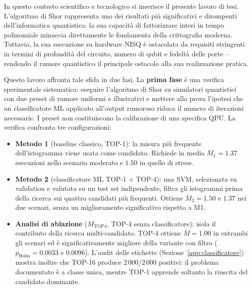 \begin{onehalfspace}
In questo contesto scientifico e tecnologico si inserisce il presente lavoro di tesi. L'algoritmo di Shor rappresenta uno dei risultati più significativi e dirompenti dell'informatica quantistica: la sua capacità di fattorizzare interi in tempo polinomiale minaccia direttamente le fondamenta della crittografia moderna. Tuttavia, la sua esecuzione su hardware NISQ è ostacolata da requisiti stringenti in termini di profondità del circuito, numero di qubit e fedeltà delle porte -- rendendo il rumore quantistico il principale ostacolo alla sua realizzazione pratica.

Questo lavoro affronta tale sfida in due fasi. La \textbf{prima fase} è una verifica sperimentale sistematica: eseguire l'algoritmo di Shor su simulatori quantistici con due preset di rumore uniformi e illustrativi e mettere alla prova l'ipotesi che un classificatore \ac{ML} applicato all'output rumoroso riduca il numero di iterazioni necessarie. I preset non costituiscono la calibrazione di una specifica QPU. La verifica confronta tre configurazioni:
\begin{itemize}
    \item \textbf{Metodo 1} (baseline classico, TOP-1): la misura più frequente dell'istogramma viene usata come candidato. Richiede in media $\bar{M}_1=1.37$ esecuzioni nello scenario moderato e $1.50$ in quello di stress.
    \item \textbf{Metodo 2} (classificatore \ac{ML} TOP-1 + TOP-4): una \ac{SVM}, selezionata su validation e valutata su un test set indipendente, filtra gli istogrammi prima della ricerca sui quattro candidati più frequenti. Ottiene $\bar{M}_2=1.50$ e $1.37$ nei due scenari, senza un miglioramento significativo rispetto a M1.
    \item \textbf{Analisi di ablazione} ($M_{\text{TOP4}}$, TOP-4 senza classificatore): isola il contributo della ricerca multi-candidato. TOP-4 ottiene $\bar{M}=1.00$ in entrambi gli scenari ed è significativamente migliore della variante con filtro ($p_{\mathrm{Holm}}=0.0033$ e $0.0096$). L'audit delle etichette (Sezione~\ref{app:classificatore}) mostra inoltre che TOP-16 produce $2\,000/2\,000$ positivi: il problema documentato è a classe unica, mentre TOP-1 apprende soltanto la riuscita del candidato dominante.
\end{itemize}


\end{onehalfspace}
